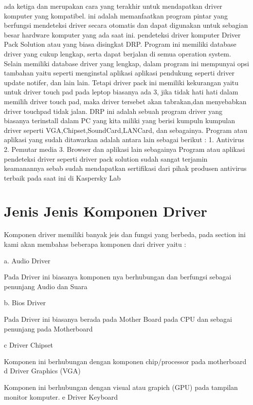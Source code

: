 ada ketiga dan merupakan cara yang terakhir untuk mendapatkan driver komputer yang kompatibel.
ini adalah memanfaatkan program pintar yang berfungsi mendeteksi driver secara otomatis dan dapat digunakan untuk sebagian besar hardware komputer yang ada saat ini.
pendeteksi driver komputer  Driver Pack Solution atau yang biasa disingkat DRP.
Program ini memiliki database driver yang cukup lengkap, serta dapat berjalan di semua operation system.
Selain memiliki database driver yang lengkap, dalam program ini mempunyai opsi tambahan yaitu seperti menginstal aplikasi aplikasi pendukung seperti driver update notifer, dan lain lain.
Tetapi driver pack ini memiliki kekurangan yaitu untuk driver touch pad pada leptop biasanya ada 3, jika tidak hati hati dalam memilih driver touch pad, maka driver tersebet akan tabrakan,dan menyebabkan driver touchpad tidak jalan.
DRP ini adalah sebuah program driver yang biasanya terinstall dalam PC yang kita miliki yang berisi kumpuln kumpulan driver seperti VGA,Chipset,SoundCard,LANCard, dan sebagainya.
Program atau aplikasi  yang sudah ditawarkan adalah antara lain sebagai berikut :
1.	Antivirus 
2.	Pemutar media
3.	Browser dan aplikasi lain sebagainya 
Program atau aplikasi pendeteksi driver seperti driver pack solution sudah sangat terjamin keamanannya sebab sudah mendapatkan sertifikasi dari pihak produsen antivirus terbaik pada saat ini di Kaspersky Lab

\section{Jenis Jenis Komponen Driver}

Komponen driver memiliki banyak jeis dan fungsi yang berbeda, pada section ini kami akan membahas beberapa komponen dari driver yaitu : 

a. Audio Driver

Pada Driver ini biasanya komponen nya berhubungan dan berfungsi sebagai penunjang Audio dan Suara

b. Bios Driver

Pada Driver ini biasanya berada pada Mother Board pada CPU dan sebagai penunjang pada Motherboard

c	Driver Chipset 

 Komponen ini berhubungan dengan komponen chip/processor pada motherboard
d	Driver Graphics (VGA) 

 Komponen ini berhubungan dengan visual atau grapich (GPU) pada tampilan monitor komputer.
e	Driver Keyboard 

